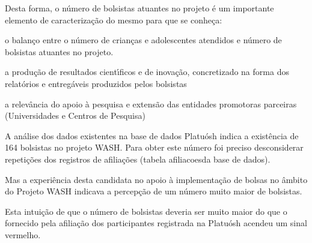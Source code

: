 \documentclass[
12pt,		%
openright,	%
twoside,  %
a4paper,			%
chapter=TITLE,		%
english,			%
french,				%
spanish,			%
brazil				%
]{USPSC-classe/USPSC}
\begin{document}
Desta forma, o n\'umero de bolsistas atuantes no projeto \'e um importante elemento de caracteriza\c{c}\~ao do mesmo para que se conhe\c{c}a:















\begin{alineas}
\item o balan\c{c}o entre o n\'umero de crian\c{c}as e adolescentes atendidos e n\'umero de  bolsistas atuantes no projeto.
\item a produ\c{c}\~ao de resultados cient\'{\i}ficos e de inova\c{c}\~ao, concretizado na forma dos relat\'orios  e entreg\'aveis produzidos pelos bolsistas
\item a relev\^ancia do apoio \`a pesquisa e extens\~ao das entidades promotoras parceiras (Universidades e Centros de Pesquisa)
\end{alineas}

A an\'alise dos dados existentes na base de dados Platu\'osh indica a exist\^encia de 164 bolsistas no projeto WASH. Para obter este n\'umero foi preciso desconsiderar repeti\c{c}\~oes dos registros de afilia\c{c}\~oes (tabela \textquotedbl afiliacoes\textquotedbl  da base de dados).














Mas a experi\^encia desta candidata no apoio \`a implementa\c{c}\~ao de bolsas no \^ambito do Projeto WASH indicava a percep\c{c}\~ao de um n\'umero muito maior de bolsistas.














Esta intui\c{c}\~ao de que o n\'umero de bolsistas deveria ser muito maior do que o fornecido pela afilia\c{c}\~ao dos participantes registrada na Platu\'osh acendeu um sinal vermelho.
\end{document}
